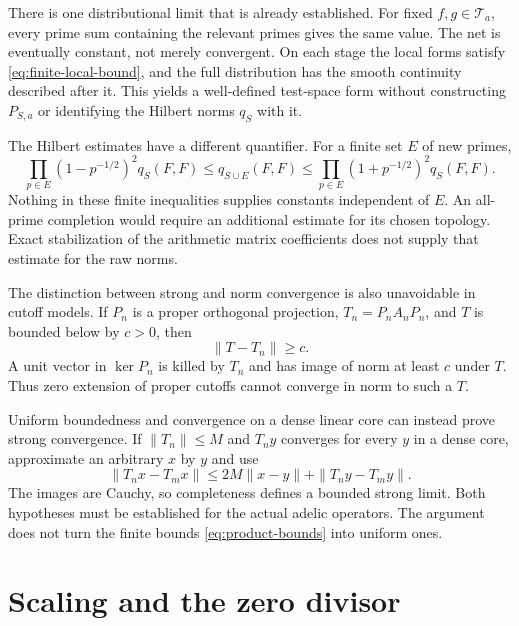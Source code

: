 \documentclass[11pt,letterpaper]{article}
\theoremstyle{definition}
\theoremstyle{remark}
\newcommand{\T}{\mathcal T}
\begin{document}
There is one distributional limit that is already established.
For fixed $f,g\in\T_a$, every prime sum containing the relevant
primes gives the same value. The net is eventually constant,
not merely convergent. On each stage the local forms satisfy
\eqref{eq:finite-local-bound}, and the full distribution has the
smooth continuity described after it. This yields a well-defined
test-space form without constructing $P_{S,a}$ or identifying
the Hilbert norms $q_S$ with it.

The Hilbert estimates have a different quantifier. For a finite
set $E$ of new primes,
\begin{equation}
 \prod_{p\in E}(1-p^{-1/2})^2q_S(F,F)
 \le q_{S\cup E}(F,F)
 \le\prod_{p\in E}(1+p^{-1/2})^2q_S(F,F).
 \label{eq:product-bounds}
\end{equation}
Nothing in these finite inequalities supplies constants
independent of $E$. An all-prime completion would require an
additional estimate for its chosen topology. Exact stabilization
of the arithmetic matrix coefficients does not supply that
estimate for the raw norms.

The distinction between strong and norm convergence is also
unavoidable in cutoff models. If $P_n$ is a proper orthogonal
projection, $T_n=P_nA_nP_n$, and $T$ is bounded below by
$c>0$, then
\begin{equation}
 \|T-T_n\|\ge c.
 \label{eq:norm-obstruction}
\end{equation}
A unit vector in $\ker P_n$ is killed by $T_n$ and has image
of norm at least $c$ under $T$. Thus zero extension of proper
cutoffs cannot converge in norm to such a $T$.

Uniform boundedness and convergence on a dense linear core can
instead prove strong convergence. If $\|T_n\|\le M$ and
$T_ny$ converges for every $y$ in a dense core, approximate
an arbitrary $x$ by $y$ and use
\begin{equation}
 \|T_nx-T_mx\|\le2M\|x-y\|+\|T_ny-T_my\|.
 \label{eq:strong-limit}
\end{equation}
The images are Cauchy, so completeness defines a bounded
strong limit. Both hypotheses must be established for the
actual adelic operators. The argument does not turn the
finite bounds \eqref{eq:product-bounds} into uniform ones.

\section{Scaling and the zero divisor}
\end{document}
